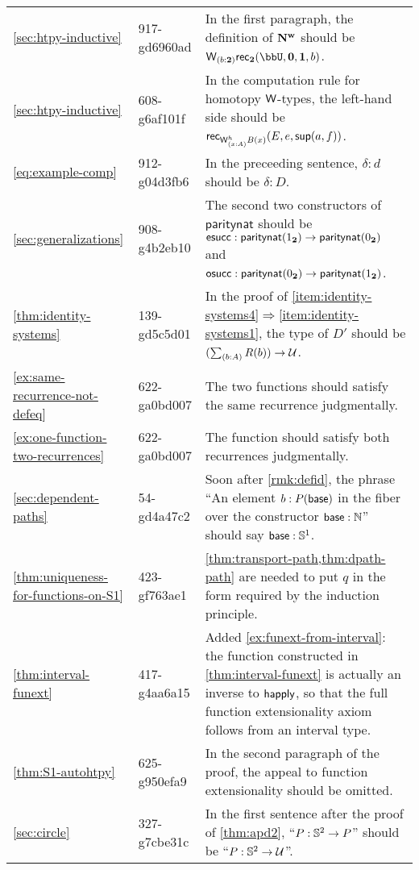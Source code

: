 \documentclass[
%
%
11pt %
]{article}
\begin{document}
\begin{longtable}{llp{10.5cm}}
  \cref{sec:htpy-inductive}
  & 917-gd6960ad
  & In the first paragraph, the definition of $\mathbf{N^w}$ should be $\wtype{b:\bool} \rec\bool(\bbU,\emptyt,\unit,b)$.\\
  \cref{sec:htpy-inductive}
  & 608-g6af101f
  & In the computation rule for homotopy $\mathsf{W}$-types, the left-hand side should be $\rec{\wtypeh{x:A} B(x)}(E,e,\supp(a,f))$.\\
  \cref{eq:example-comp}
  & 912-g04d3fb6
  & In the preceeding sentence, $\delta:d$ should be $\delta:D$.\\
  \cref{sec:generalizations}
  & 908-g4b2eb10
  & The second two constructors of $\mathsf{paritynat}$ should be $\mathsf{esucc} : \mathsf{paritynat}({1_{\mathbf{2}}}) \to \mathsf{paritynat}({0_{\mathbf{2}}})$ and $\mathsf{osucc} : \mathsf{paritynat}({0_{\mathbf{2}}}) \to \mathsf{paritynat}({1_{\mathbf{2}}})$.\\
  \cref{thm:identity-systems}
  & 139-gd5c5d01
  & In the proof of \ref{item:identity-systems4}$\Rightarrow$\ref{item:identity-systems1}, the type of $D'$ should be $(\sm{b:A} R(b)) \to \type$.\\
  \cref{ex:same-recurrence-not-defeq}
  & 622-ga0bd007
  & The two functions should satisfy the same recurrence judgmentally.\\
  \cref{ex:one-function-two-recurrences}
  & 622-ga0bd007
  & The function should satisfy both recurrences judgmentally.\\
  \cref{sec:dependent-paths}
  & 54-gd4a47c2
  & Soon after \cref{rmk:defid}, the phrase ``An element $b:P(\mathsf{base})$ in the fiber over the constructor $\mathsf{base}:\mathbb{N}$'' should say $\mathsf{base}:\mathbb{S}^1$.\\
  \cref{thm:uniqueness-for-functions-on-S1}
  & 423-gf763ae1
  & \cref{thm:transport-path,thm:dpath-path} are needed to put $q$ in the form required by the induction principle.\\
  \cref{thm:interval-funext}
  & 417-g4aa6a15
  & Added \cref{ex:funext-from-interval}: the function constructed in \cref{thm:interval-funext} is actually an inverse to $\mathsf{happly}$, so that the full function extensionality axiom follows from an interval type.\\
  \cref{thm:S1-autohtpy}
  & 625-g950efa9
  & In the second paragraph of the proof, the appeal to function extensionality should be omitted.\\
  \cref{sec:circle}
  & 327-g7cbe31c
  & In the first sentence after the proof of \cref{thm:apd2}, ``$P:\mathbb{S}^2\to P$'' should be ``$P:\mathbb{S}^2\to\mathcal{U}$''.\\

\end{longtable}
\end{document}
